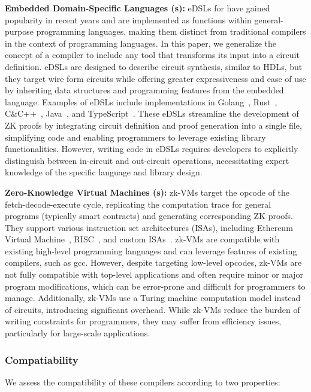 \documentclass[letterpaper,twocolumn,10pt]{article}
\theoremstyle{definition}
\newcommand{\mypara}[1]{\noindent\textbf{{#1: }}}
\newcommand{\zk}{\text{zk-SNARK}\xspace}
\newcommand{\new}[1]{{#1}\xspace}
\begin{document}
\new{\mypara{Embedded Domain-Specific Languages (s)}eDSLs for \zk have gained popularity in recent years and are implemented as functions within general-purpose programming languages, making them distinct from traditional compilers in the context of programming languages. In this paper, we generalize the concept of a compiler to include any tool that transforms its input into a circuit definition. eDSLs are designed to describe circuit synthesis, similar to HDLs, but they target wire form circuits while offering greater expressiveness and ease of use by inheriting data structures and programming features from the embedded language. Examples of eDSLs include implementations in Golang~\cite{gnark}, Rust~\cite{halo2,halo2ce,arkworks,plonky2,zksecurity2023noname,bellman}, C\&C++~\cite{libsnark,libiop}, Java~\cite{kosba2018xjsnark}, and TypeScript~\cite{mina2021o1js}. These eDSLs streamline the development of ZK proofs by integrating circuit definition and proof generation into a single file, simplifying code and enabling programmers to leverage existing library functionalities. However, writing code in eDSLs requires developers to explicitly distinguish between in-circuit and out-circuit operations, necessitating expert knowledge of the specific language and library design.}

\new{\mypara{Zero-Knowledge Virtual Machines (s)}zk-VMs target the opcode of the fetch-decode-execute cycle, replicating the computation trace for general programs (typically smart contracts) and generating corresponding ZK proofs. They support various instruction set architectures (ISAs), including Ethereum Virtual Machine~\cite{scroll2023,polygon,era2023}, RISC~\cite{bruestle2023riscZeroZkVM,arun2024jolt}, and custom ISAs~\cite{goldberg2021cairo,zhang2023polynomial,bootle2018arya}. zk-VMs are compatible with existing high-level programming languages and can leverage features of existing compilers, such as gcc. However, despite targeting low-level opcodes, zk-VMs are not fully compatible with top-level applications and often require minor or major program modifications, which can be error-prone and difficult for programmers to manage. Additionally, zk-VMs use a Turing machine computation model instead of circuits, introducing significant overhead. While zk-VMs reduce the burden of writing constraints for programmers, they may suffer from efficiency issues, particularly for large-scale applications.}

\subsubsection{Compatiability}
\new{We assess the compatibility of these compilers according to two properties:}
\end{document}
